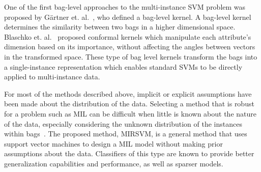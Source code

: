 \documentclass[reqno]{vcuthesis}
\numberwithin{equation}{chapter}
\begin{document}
One of the first bag-level approaches to the multi-instance SVM problem was proposed by G{\"a}rtner et. al.~\cite{Smola2002}, who defined a bag-level kernel. A bag-level kernel determines the similarity between two bags in a higher dimensional space. Blaschko et. al.~\cite{Blaschko2006} proposed conformal kernels which manipulate each attribute's dimension based on its importance, without affecting the angles between vectors in the transformed space. These type of bag level kernels transform the bags into a single-instance representation which enables standard SVMs to be directly applied to multi-instance data. 

For most of the methods described above, implicit or explicit assumptions have been made about the distribution of the data. Selecting a method that is robust for a problem such as MIL can be difficult when little is known about the nature of the data, especially considering the unknown distribution of the instances within bags~\cite{Amores2013}. The proposed method, MIRSVM, is a general method that uses support vector machines to design a MIL model without making prior assumptions about the data. Classifiers of this type are known to provide better generalization capabilities and performance, as well as sparser models.
\end{document}
